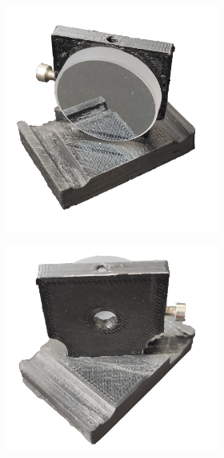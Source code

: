 \documentclass[twoside,openright]{scrreprt}
\begin{document}
\begin{figure}[hbtp]
\centering
\begin{subfigure}[t]{0.66\textwidth}
\begin{subfigure}[t]{0.45\columnwidth}
\centering
\includegraphics[width=\columnwidth]{images/TAM/MirrorDropInFrontFree.png}
\end{subfigure}
\hfill
\centering
\begin{subfigure}[t]{0.45\columnwidth}
\centering
\includegraphics[width=\columnwidth]{images/TAM/MirrorDropInBackFree.png}

\end{subfigure}
\end{subfigure}
\end{figure}
\end{document}
